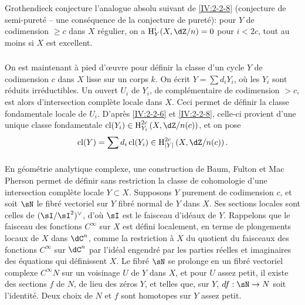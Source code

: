 \subsubsection{}\label{IV:2-2-9}

Grothendieck conjecture l'analogue absolu suivant de \ref{IV:2-2-8} (conjecture 
de semi-pureté -- une conséquence de la conjecture de pureté): pour $Y$ 
de codimension $\geqslant c$ dans $X$ régulier, on a $\h_Y^i(X,\dZ/n)=0$ pour 
$i<2 c$, tout au moins si $X$ est excellent. 





\subsubsection{}\label{IV:2-2-10}

On est maintenant à pied d'œuvre pour définir la classe d'un cycle $Y$ de 
codimension $c$ dans $X$ lisse sur un corps $k$. On écrit $Y=\sum d_i Y_i$, 
où les $Y_i$ sont réduits irréductibles. Un ouvert $U_i$ de $Y_i$, de 
complémentaire de codimension $>c$, est alors d'intersection complète 
locale dans $X$. Ceci permet de définir la classe fondamentale locale de 
$U_i$. D'après \ref{IV:2-2-6} et \ref{IV:2-2-8}, celle-ci provient d'une 
unique classe fondamentale $\cl(Y_i)\in \h_{Y_i}^{2 c}\left(X,\dZ/n(c)\right)$, 
et on pose 
\[
  \cl(Y) = \sum d_i \cl(Y_i) \in \h_{|Y|}^{2 c}\left(X,\dZ/n(c)\right) \text{.}
\]





\subsubsection{}\label{IV:2-2-11}

En géométrie analytique complexe, une construction de Baum, Fulton et 
Mac Pherson \cite{bfm75} permet de définir sans restriction la classe de 
cohomologie d'une intersection complète locale $Y\subset X$. Supposons $Y$ 
purement de codimension $c$, et soit $\sN$ le fibré vectoriel sur $Y$ fibré 
normal de $Y$ dans $X$. Ses sections locales sont celles de $(\sI/\sI^2)^\vee$, 
d'où $\sI$ est le faisceau d'idéaux de $Y$. Rappelons que le faisceau des 
fonctions $C^\infty$ sur $X$ est défini localement, en terme de plongements 
locaux de $X$ dans $\dC^n$, comme la restriction à $X$ du quotient du 
faisceaux des fonctions $C^\infty$ sur $\dC^n$ par l'idéal engendré par les 
parties réelles et imaginaires des équations qui définissent $X$. Le 
fibré $\sN$ se prolonge en un fibré vectoriel complexe $C^\infty N$ sur un 
voisinage $U$ de $Y$ dans $X$, et pour $U$ assez petit, il existe des sections 
$f$ de $N$, de lieu des zéros $Y$, et telles que, sur $Y$, $d f:\sN\to N$ 
soit l'identité. Deux choix de $N$ et $f$ sont homotopes sur $Y$ assez petit. 

